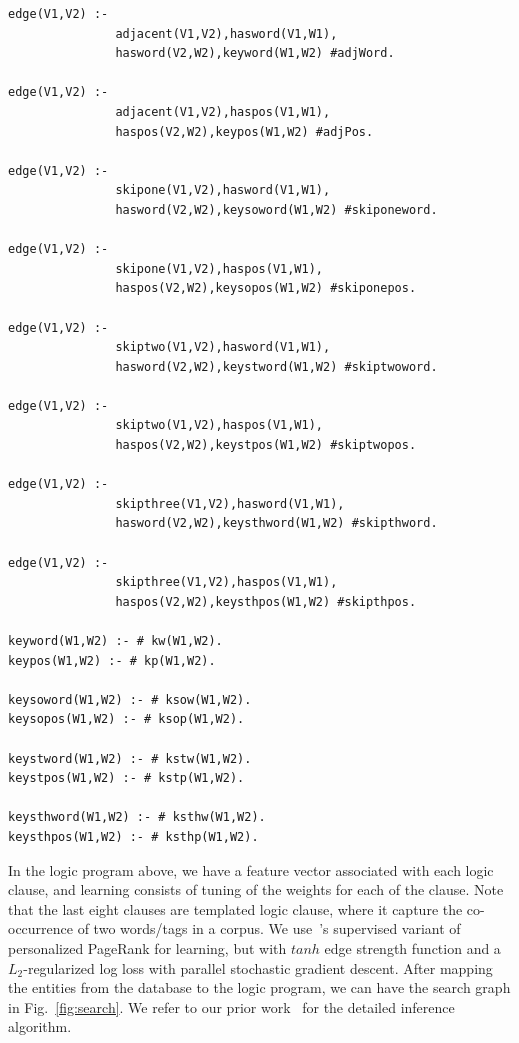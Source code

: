\documentclass[11pt,letterpaper]{article}
\begin{document}
\begin{verbatim}
edge(V1,V2) :- 
               adjacent(V1,V2),hasword(V1,W1),
               hasword(V2,W2),keyword(W1,W2) #adjWord.

edge(V1,V2) :- 
               adjacent(V1,V2),haspos(V1,W1),
               haspos(V2,W2),keypos(W1,W2) #adjPos.

edge(V1,V2) :- 
               skipone(V1,V2),hasword(V1,W1),
               hasword(V2,W2),keysoword(W1,W2) #skiponeword.

edge(V1,V2) :- 
               skipone(V1,V2),haspos(V1,W1),
               haspos(V2,W2),keysopos(W1,W2) #skiponepos.

edge(V1,V2) :- 
               skiptwo(V1,V2),hasword(V1,W1),
               hasword(V2,W2),keystword(W1,W2) #skiptwoword.

edge(V1,V2) :- 
               skiptwo(V1,V2),haspos(V1,W1),
               haspos(V2,W2),keystpos(W1,W2) #skiptwopos.

edge(V1,V2) :- 
               skipthree(V1,V2),hasword(V1,W1),
               hasword(V2,W2),keysthword(W1,W2) #skipthword.

edge(V1,V2) :-
               skipthree(V1,V2),haspos(V1,W1),
               haspos(V2,W2),keysthpos(W1,W2) #skipthpos. 

keyword(W1,W2) :- # kw(W1,W2).
keypos(W1,W2) :- # kp(W1,W2).

keysoword(W1,W2) :- # ksow(W1,W2).
keysopos(W1,W2) :- # ksop(W1,W2).

keystword(W1,W2) :- # kstw(W1,W2).
keystpos(W1,W2) :- # kstp(W1,W2).

keysthword(W1,W2) :- # ksthw(W1,W2).
keysthpos(W1,W2) :- # ksthp(W1,W2).

\end{verbatim}
In the logic program above, we have a feature vector associated 
with each logic clause, and learning consists of tuning of the 
weights for each of the clause. Note that the last eight clauses
are templated logic clause, where it capture the co-occurrence
of two words/tags in a corpus.
We use~\cite{backstrom2011supervised}'s supervised variant
of personalized PageRank for learning, but with $tanh$ edge strength
function and a $L_2$-regularized log loss with parallel stochastic gradient descent.
After mapping the entities from the database to the logic program,
we can have the search graph in Fig.~\ref{fig:search}.
We refer to our prior work~\cite{wangprogramming2013} for the detailed inference algorithm.
\end{document}

